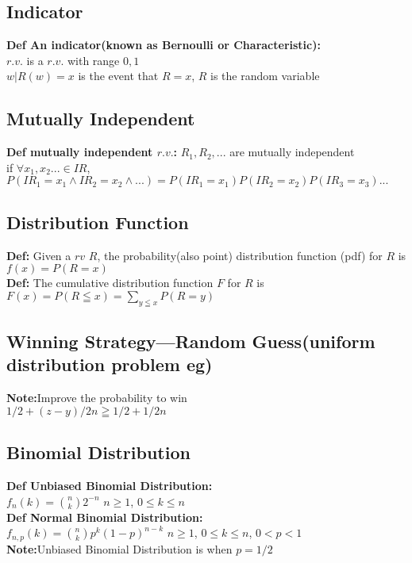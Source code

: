 \documentclass{article}
\begin{document}
\subsection{Indicator}
\textbf{Def An indicator(known as Bernoulli or Characteristic):}  \\
$r.v.$ is a $r.v.$ with range ${0,1}$  \\
${w|R(w)=x}$ is the event that $R=x$, $R$ is the random variable  \\
\subsection{Mutually Independent}
\textbf{Def mutually independent $r.v.$:} $R_1, R_2,...$ are mutually independent  \\
if $\forall x_1, x_2 ... \in IR$, $P(IR_1=x_1\wedge IR_2=x_2\wedge ...)=P(IR_1=x_1)P(IR_2=x_2)P(IR_3=x_3)...$ \\
\subsection{Distribution Function}
\textbf{Def:} Given a $rv$ $R$, the probability(also point) distribution function (pdf) for $R$ is $f(x)=P(R=x)$ \\
\textbf{Def:} The cumulative distribution function $F$ for $R$ is $F(x)=P(R\leqq x)=\sum_{y\leqq x}P(R=y)$   \\
\subsection{Winning Strategy---Random Guess(uniform distribution problem eg)}
\textbf{Note:}Improve the probability to win  \\
$1/2+(z-y)/2n\geqq 1/2+1/2n$
\begin{comment}
How to win when randomly choose an envelop from two to get a bigger number?  \\
0. Envelopes contain $y$ and $z\in[0,n]$ where $y<z$  \\
1. Player chooses $x$ uniformly in ${1/2 | 1\frac{1}{2} | 2\frac{1}{2} ... | n\frac{1}{2}}$  \\
2. Player hopes $y<x<z$ \\
3. Player opens random envelop to reveal $r\in{y,z}$  \\
4. Player swaps if $r<x$ \\
\end{comment}
\subsection{Binomial Distribution}
\textbf{Def Unbiased Binomial Distribution:}  \\
$f_n(k) = {n \choose k}2^{-n}$ $n\geqslant 1$, $0\leqslant k\leqslant n$  \\
\textbf{Def Normal Binomial Distribution:}  \\
$f_{n,p}(k) = {n \choose k}p^k(1-p)^{n-k}$ $n\geqslant 1$, $0\leqslant k\leqslant n$, $0<p<1$ \\

\textbf{Note:}Unbiased Binomial Distribution is when $p=1/2$  \\
\end{document}
